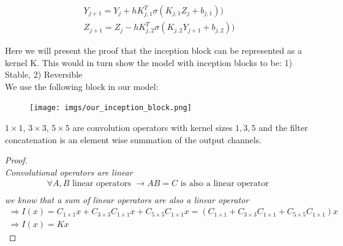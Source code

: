 \documentclass{article}
\theoremstyle{remark}
\begin{document}
\begin{gather*}
    Y_{j+1} = Y_{j} + h K^T_{j,1} \sigma (K_{j,1} Z_j + b_{j,1})) \\
    Z_{j+1} = Z_{j} - h K^T_{j,2} \sigma (K_{j,2} Y_{j+1} + b_{j,2}))
\end{gather*}
    
Here we will present the proof that the inception block can be represented as a kernel K. This would in turn show the model with inception blocks to be: 1) Stable, 2) Reversible \\
We use the following block in our model: \\
\begin{figure}[H]
    \centering
    \texttt{[image: imgs/our\_inception\_block.png]}
\end{figure}
$1 \times 1$, $3 \times 3$, $5 \times 5$ are convolution operators with kernel sizes $1, 3, 5$ and the filter concatenation is an element wise summation of the output channels.\\
\begin{proof}\ \\
\textit{Convolutional operators are linear \cite{Signals and Systems}}\\
\begin{gather*}
    \forall A,B \text{ linear operators } \rightarrow AB = C \text{ is also a linear operator }\\
\end{gather*}
\textit{we know that a sum of linear operators are also a linear operator}\\
\begin{gather*}
    \Rightarrow I(x) = C_{1 \times 1} x + C_{3 \times 3} C_{1 \times 1} x + C_{5 \times 5} C_{1 \times 1} x = (C_{1 \times 1} + C_{3 \times 3} C_{1 \times 1} + C_{5 \times 5} C_{1 \times 1}) x \\
    \Rightarrow I(x) = Kx
\end{gather*}
\end{proof}
\end{document}
